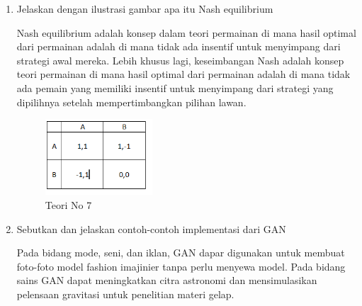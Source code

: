\begin{enumerate}
            \item Jelaskan dengan ilustrasi gambar apa itu Nash equilibrium
            \par Nash equilibrium adalah konsep dalam teori permainan di mana hasil optimal dari permainan adalah di mana tidak ada insentif untuk menyimpang dari strategi awal mereka. Lebih khusus lagi, keseimbangan Nash adalah konsep teori permainan di mana hasil optimal dari permainan adalah di mana tidak ada pemain yang memiliki insentif untuk menyimpang dari strategi yang dipilihnya setelah mempertimbangkan pilihan lawan.
            \begin{figure}[H]
                \includegraphics[width=4cm]{figures/1174040/chapter8/teori7.png}
                \centering
                  \caption{Teori No 7}
            \end{figure}

            \item Sebutkan dan jelaskan contoh-contoh implementasi dari GAN
            \par Pada bidang mode, seni, dan iklan, GAN dapar digunakan untuk membuat foto-foto model fashion imajinier tanpa perlu menyewa model. Pada bidang sains GAN dapat meningkatkan citra astronomi dan mensimulasikan pelensaan gravitasi untuk penelitian materi gelap.


\end{enumerate}
